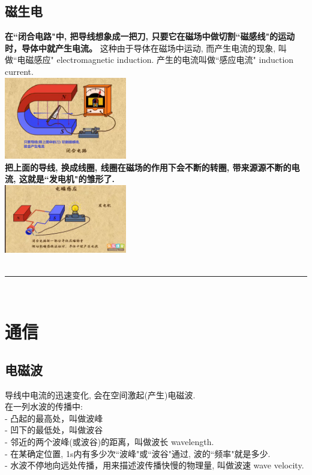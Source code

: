 \documentclass[UTF8]{ctexart}
\begin{document}
		\subsection{磁生电}
		\textbf{在``闭合电路"中, 把导线想象成一把刀, 只要它在磁场中做切割``磁感线"的运动时，导体中就产生电流。} 这种由于导体在磁场中运动, 而产生电流的现象, 叫做``电磁感应"  electromagnetic induction. 产生的电流叫做``感应电流" induction current. 	\\			
		\includegraphics[width=0.4\textwidth]{img/0099.png} \\
		
		\textbf{把上面的导线, 换成线圈, 线圈在磁场的作用下会不断的转圈, 带来源源不断的电流, 这就是``发电机"的雏形了.} \\
		\includegraphics[width=0.4\textwidth]{img/0100.png} \\
		
		
		~\\
		\hrule
		~\\
		
		
	\section{通信}		
		\subsection{电磁波}
		
		导线中电流的迅速变化, 会在空间激起(产生)电磁波. \\
		
		在一列水波的传播中: \\
		- 凸起的最高处，叫做波峰 \\ 
		- 凹下的最低处，叫做波谷 \\
		- 邻近的两个波峰(或波谷)的距离，叫做波长 wavelength. \\
		- 在某确定位置, 1s内有多少次``波峰"或``波谷"通过, 波的``频率"就是多少. \\
		- 水波不停地向远处传播，用来描述波传播快慢的物理量, 叫做波速 wave velocity. \\
		
\end{document}
